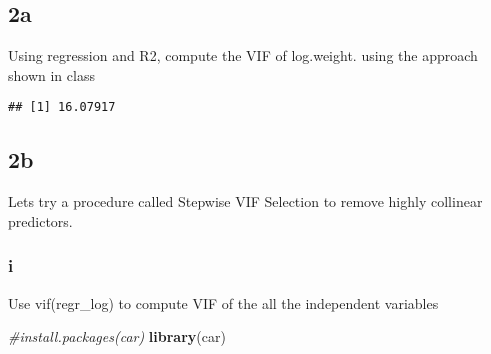 \documentclass[
]{article}
\newenvironment{Shaded}{\begin{snugshade}}{\end{snugshade}}
\newcommand{\AttributeTok}[1]{\textcolor[rgb]{0.13,0.29,0.53}{#1}}
\newcommand{\CommentTok}[1]{\textcolor[rgb]{0.56,0.35,0.01}{\textit{#1}}}
\newcommand{\DecValTok}[1]{\textcolor[rgb]{0.00,0.00,0.81}{#1}}
\newcommand{\FunctionTok}[1]{\textcolor[rgb]{0.13,0.29,0.53}{\textbf{#1}}}
\newcommand{\NormalTok}[1]{#1}
\newcommand{\OtherTok}[1]{\textcolor[rgb]{0.56,0.35,0.01}{#1}}
\newcommand{\SpecialCharTok}[1]{\textcolor[rgb]{0.81,0.36,0.00}{\textbf{#1}}}
\newcommand{\StringTok}[1]{\textcolor[rgb]{0.31,0.60,0.02}{#1}}
\begin{document}
\hypertarget{a-1}{%
\subsection{2a}\label{a-1}}

Using regression and R2, compute the VIF of log.weight. using the
approach shown in class

\begin{Shaded}
\end{Shaded}

\begin{verbatim}
## [1] 16.07917
\end{verbatim}

\hypertarget{b-1}{%
\subsection{2b}\label{b-1}}

Let\textquotesingle s try a procedure called Stepwise VIF Selection to
remove highly collinear predictors.

\hypertarget{i-2}{%
\subsubsection{i}\label{i-2}}

Use vif(regr\_log) to compute VIF of the all the independent variables

\begin{Shaded}
\begin{Highlighting}[]
\CommentTok{\#install.packages(\textquotesingle{}car\textquotesingle{})}
\FunctionTok{library}\NormalTok{(}\StringTok{\textquotesingle{}car\textquotesingle{}}\NormalTok{)}
\end{Highlighting}
\end{Shaded}
\end{document}
